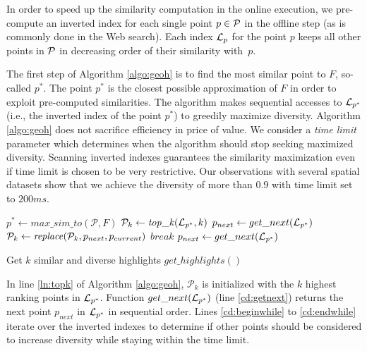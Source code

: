 \vspace{2pt}
In order to speed up the similarity computation in the online execution, we pre-compute an inverted index for each single point $p \in {\cal P}$ in the offline step (as is commonly done in the Web search). Each index ${\cal L}_p$ for the point $p$ keeps all other points in ${\cal P}$ in decreasing order of their similarity with~$p$.

\vspace{2pt}
The first step of Algorithm \ref{algo:geoh} is to find the most similar point to $F$, so-called $p^*$. The point $p^*$ is the closest possible approximation of $F$ in order to exploit pre-computed similarities. The algorithm makes sequential accesses to ${\cal L}_{p^*}$ (i.e., the inverted index of the point $p^*$) to greedily maximize diversity. Algorithm \ref{algo:geoh} does not sacrifice efficiency in price of value. We consider a {\em time limit} parameter which determines when the algorithm should stop seeking maximized diversity. Scanning inverted indexes guarantees the similarity maximization even if time limit is chosen to be very restrictive. Our observations with several spatial datasets show that we achieve the diversity of more than $0.9$ with time limit set to $200ms$.


\begin{algorithm}[t]
\DontPrintSemicolon
{}
$p^* \gets \mathit{max\_sim\_to}(\mathcal{P},F)$\;
$\mathcal{P}_k \gets \mathit{top\_k}(\mathit{{\cal L}_{p^*}},k)$\label{ln:topk}\;
$p_{next} \gets get\_next(\mathit{{\cal L}_{p^*}})$\;\label{cd:getnext}
       {\label{cd:beginwhile}
              {
                     {\label{cd:betterdiv}
                     ${\cal P}_k \gets \mathit{replace}({\cal P}_k,p_{next},p_{current})$\;
                            $break$\;
                     }
              }
              $p_{next} \gets get\_next(\mathit{{\cal L}_{p^*}})$\;}\label{cd:endwhile}
       \; 
       \caption{Get $k$ similar and diverse highlights $\mathit{get\_highlights}()$}
       \label{algo:geoh}
\end{algorithm}

\vspace{2pt}
In line \ref{ln:topk} of Algorithm \ref{algo:geoh}, $\mathcal{P}_k$ is initialized with the $k$ highest ranking points in ${\cal L}_{p^*}$. Function $get\_next({\cal L}_{p^*})$ (line \ref{cd:getnext}) returns the next point $p_{next}$ in ${\cal L}_{p^*}$ in sequential order. Lines \ref{cd:beginwhile} to \ref{cd:endwhile} iterate over the inverted indexes to determine if other points should be considered to increase diversity while staying within the time limit.

